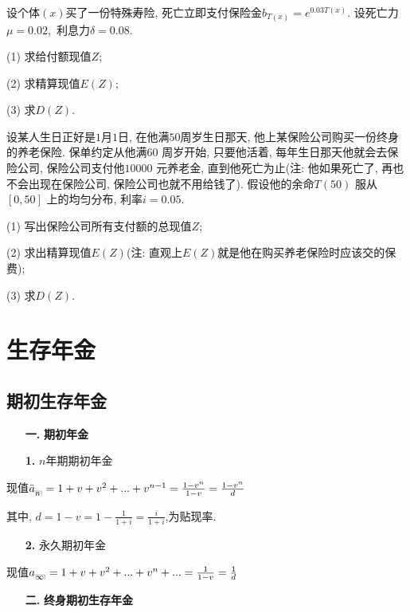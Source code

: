 \documentclass[a4paper,10pt]{ctexbook}
\makeatletter
\newcommand{\hei}{\CJKfamily{hei}}      %
\DeclareRobustCommand{\annu}[1]{_{%
    \def\arraystretch{0}%
    \setlength\arraycolsep{1pt}%
    \setlength\arrayrulewidth{.2pt}%
    \begin{array}[b]{@{}c|}\hline
        \\[\arraycolsep]%
        \scriptstyle #1%
    \end{array}%
}}
\makeatother
\begin{document}
\begin{exs}
    设个体$(x)$买了一份特殊寿险, 死亡立即支付保险金$b_{T(x)}=e^{0.03T(x)}.$ 设死亡力$\mu=0.02,$ 利息力$\delta=0.08.$

    (1) 求给付额现值$Z;$

    (2) 求精算现值$E(Z);$

    (3) 求$D(Z).$
\end{exs}

\begin{exs}
    设某人生日正好是$1$月$1$日, 在他满$50$周岁生日那天, 他上某保险公司购买一份终身的养老保险. 保单约定从他满$60$ 周岁开始, 只要他活着, 每年生日那天他就会去保险公司, 保险公司支付他$10000$ 元养老金, 直到他死亡为止(注: 他如果死亡了, 再也不会出现在保险公司, 保险公司也就不用给钱了). 假设他的余命$T(50)$ 服从$[0,50]$ 上的均匀分布, 利率$i=0.05.$

    (1) 写出保险公司所有支付额的总现值$Z$;

    (2) 求出精算现值$E(Z)$(注: 直观上$E(Z)$就是他在购买养老保险时应该交的保费);

    (3) 求$D(Z).$
\end{exs}


\chapter{生存年金}
\section{期初生存年金}
\begin{itemize}
    \item[{\bf\hei 一.}]{\bf\hei 期初年金}
\end{itemize}

\begin{itemize}
    \item[{\bf\hei 1.}]$n$年期期初年金
\end{itemize}

现值$\ddot a_{\annu n}=1+v+v^2+...+v^{n-1}=\frac{1-v^n}{1-v}=\frac{1-v^n}{d}$

其中, $d=1-v=1-\frac{1}{1+i}=\frac{i}{1+i}$,为贴现率.
\begin{itemize}
    \item[{\bf\hei 2.}]永久期初年金
\end{itemize}

现值$a_{\annu {\infty}}=1+v+v^2+...+v^n+...=\frac{1}{1-v}=\frac{1}{d}$
\begin{itemize}
    \item[{\bf\hei 二.}]{\bf\hei 终身期初生存年金}
\end{itemize}
\end{document}
